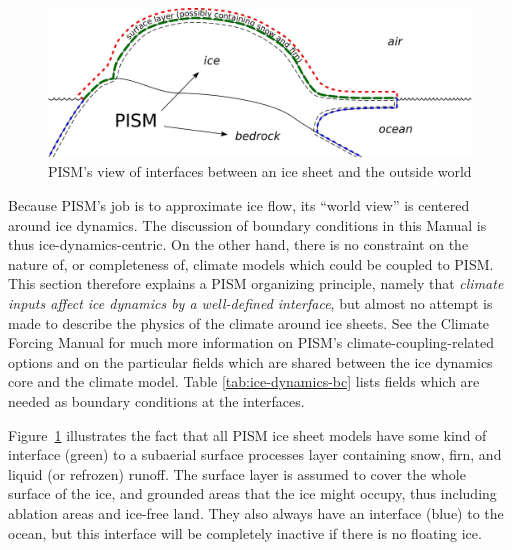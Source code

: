 \begin{figure}[ht]
  \centering
  \includegraphics[width=6in]{figs/climate-cartoon.pdf}
  \caption{PISM's view of interfaces between an ice sheet and the outside world}
  \label{fig:climate-inputs}
\end{figure}

Because PISM's job is to approximate ice flow, its ``world view'' is centered around ice dynamics.  The discussion of boundary conditions in this Manual is thus ice-dynamics-centric.  On the other hand, there is no constraint on the nature of, or completeness of, climate models which could be coupled to PISM.  This section therefore explains a PISM organizing principle, namely that \emph{climate inputs affect ice dynamics by a well-defined interface}, but almost no attempt is made to describe the physics of the climate around ice sheets.  See the Climate Forcing Manual for much more information on PISM's climate-coupling-related options and on the particular fields which are shared between the ice dynamics core and the climate model.  Table \ref{tab:ice-dynamics-bc} lists fields which are needed as boundary conditions at the interfaces.

Figure~\ref{fig:climate-inputs} illustrates the fact that all PISM ice sheet models have some kind of interface (green) to a subaerial surface processes layer containing snow, firn, and liquid (or refrozen) runoff.  The surface layer is assumed to cover the whole surface of the ice, and grounded areas that the ice might occupy, thus including ablation areas and ice-free land.  They also always have an interface (blue) to the ocean, but this interface will be completely inactive if there is no floating ice.

